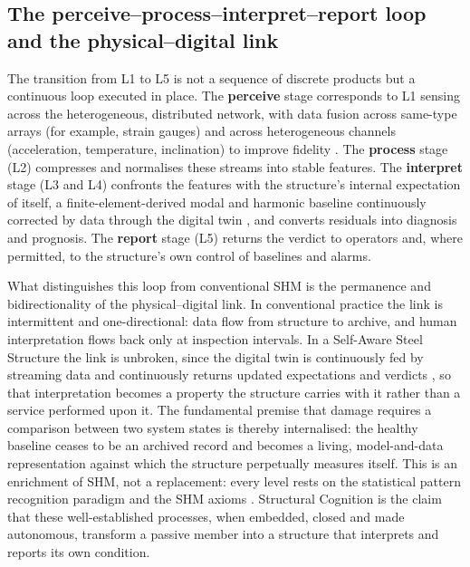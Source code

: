 \subsection{The perceive--process--interpret--report loop and the physical--digital link}\label{subsec:loop}

The transition from L1 to L5 is not a sequence of discrete products but a continuous loop executed in place. The \textbf{perceive} stage corresponds to L1 sensing across the heterogeneous, distributed network, with data fusion across same-type arrays (for example, strain gauges) and across heterogeneous channels (acceleration, temperature, inclination) to improve fidelity \citep{farrar2013shm}. The \textbf{process} stage (L2) compresses and normalises these streams into stable features. The \textbf{interpret} stage (L3 and L4) confronts the features with the structure's internal expectation of itself, a finite-element-derived modal and harmonic baseline \citep{chopra2017dynamics,cook2002fea} continuously corrected by data through the digital twin \citep{brunton2019data}, and converts residuals into diagnosis and prognosis. The \textbf{report} stage (L5) returns the verdict to operators and, where permitted, to the structure's own control of baselines and alarms.

What distinguishes this loop from conventional SHM is the permanence and bidirectionality of the physical--digital link. In conventional practice the link is intermittent and one-directional: data flow from structure to archive, and human interpretation flows back only at inspection intervals. In a Self-Aware Steel Structure the link is unbroken, since the digital twin is continuously fed by streaming data and continuously returns updated expectations and verdicts \citep{brunton2019data,li2025edge}, so that interpretation becomes a property the structure carries with it rather than a service performed upon it. The fundamental premise that damage requires a comparison between two system states \citep{farrar2013shm} is thereby internalised: the healthy baseline ceases to be an archived record and becomes a living, model-and-data representation against which the structure perpetually measures itself. This is an enrichment of SHM, not a replacement: every level rests on the statistical pattern recognition paradigm and the SHM axioms \citep{farrar2013shm}. Structural Cognition is the claim that these well-established processes, when embedded, closed and made autonomous, transform a passive member into a structure that interprets and reports its own condition.
